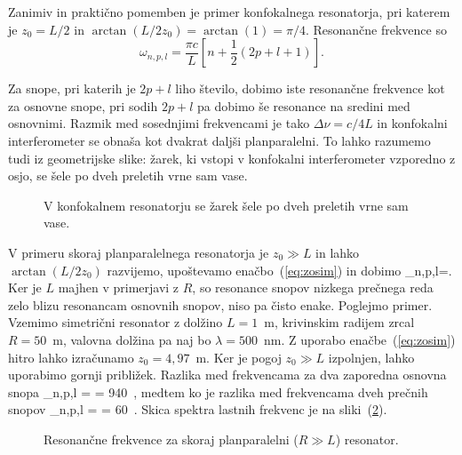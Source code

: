 Zanimiv in praktično pomemben je primer konfokalnega resonatorja,
pri katerem je $z_{0}=L/2$ in $\arctan(L/2z_{0})= \arctan(1)=\pi/4$. Resonančne frekvence
so 
\begin{equation}
\omega_{n,p,l}=\frac{\pi c}{L}\left[n+\frac{1}{2}(2p+l+1)\right].
\label{eq:omega_konf}
\end{equation}

Za snope, pri katerih je $2p+l$ liho število, dobimo iste resonančne frekvence kot
za osnovne snope, pri sodih $2p+l$ pa dobimo še resonance na sredini
med osnovnimi. Razmik med sosednjimi frekvencami je tako $\Delta\nu=c/4L$
in konfokalni interferometer se obnaša kot dvakrat daljši planparalelni.
To lahko razumemo tudi iz geometrijske slike: žarek, ki vstopi v konfokalni
interferometer vzporedno z osjo, se šele po dveh preletih vrne sam
vase.

\begin{figure}[h]
\centering
\def\svgwidth{70truemm} 

\caption{V konfokalnem resonatorju se žarek šele po dveh preletih
vrne sam vase.}
\label{fig:Konfokalni_zarek}
\end{figure}

V primeru skoraj planparalelnega 
resonatorja je $z_{0}\gg L$ in lahko
$\arctan(L/2z_{0})$ razvijemo, upoštevamo enačbo~(\ref{eq:zosim}) in dobimo
\beq
\omega_{n,p,l}=.
\eeq
Ker je $L$ majhen v primerjavi z $R$, so resonance snopov nizkega prečnega reda 
zelo blizu resonancam osnovnih snopov, niso pa čisto enake. Poglejmo primer. Vzemimo 
simetrični resonator z dolžino $L=1$~m, krivinskim radijem zrcal $R=50$~m, 
valovna dolžina pa naj bo $\lambda= 500$~nm. Z uporabo enačbe~(\ref{eq:zosim})
hitro lahko izračunamo $z_0 = 4,97$~m. Ker je pogoj $z_0\gg L$ izpolnjen, lahko uporabimo
gornji približek. Razlika med frekvencama za dva zaporedna osnovna snopa 
\beq
\Delta \omega_{n,p,l} =  = 940~,
\eeq
medtem ko je razlika med frekvencama dveh prečnih snopov
\beq
\Delta \omega_{n,p,l} =   = 60~.
\eeq
Skica spektra lastnih frekvenc je na sliki~(\ref{fig:crte}).

\begin{figure}[h]
\centering
\def\svgwidth{100truemm} 

\caption{Resonančne frekvence za skoraj planparalelni ($R\gg L$) resonator.}
\label{fig:crte}
\end{figure}

